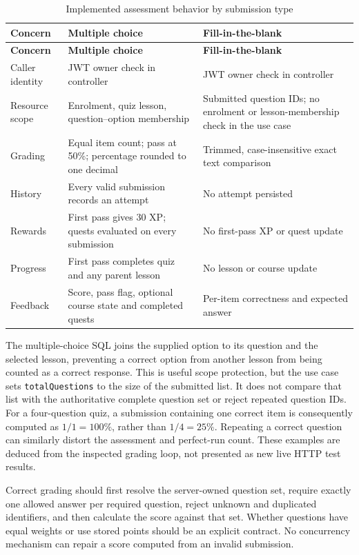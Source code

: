 \documentclass[12pt,a4paper,oneside]{report}
\begin{document}
\begin{longtable}{P{0.25\textwidth}P{0.32\textwidth}P{0.32\textwidth}}
\caption{Implemented assessment behavior by submission type}\label{tab:quiz-behavior}\\\toprule
\textbf{Concern} & \textbf{Multiple choice} & \textbf{Fill-in-the-blank}\\\midrule\endfirsthead
\toprule\textbf{Concern} & \textbf{Multiple choice} & \textbf{Fill-in-the-blank}\\\midrule\endhead
Caller identity & JWT owner check in controller & JWT owner check in controller\\
Resource scope & Enrolment, quiz lesson, question--option membership & Submitted question IDs; no enrolment or lesson-membership check in the use case\\
Grading & Equal item count; pass at 50\%; percentage rounded to one decimal & Trimmed, case-insensitive exact text comparison\\
History & Every valid submission records an attempt & No attempt persisted\\
Rewards & First pass gives 30 XP; quests evaluated on every submission & No first-pass XP or quest update\\
Progress & First pass completes quiz and any parent lesson & No lesson or course update\\
Feedback & Score, pass flag, optional course state and completed quests & Per-item correctness and expected answer\\
\bottomrule
\end{longtable}

The multiple-choice SQL joins the supplied option to its question and the selected
lesson, preventing a correct option from another lesson from being counted as a
correct response. This is useful scope protection, but the use case sets
\texttt{totalQuestions} to the size of the submitted list. It does not compare that
list with the authoritative complete question set or reject repeated question IDs.
For a four-question quiz, a submission containing one correct item is consequently
computed as $1/1 = 100\%$, rather than $1/4 = 25\%$. Repeating a correct question
can similarly distort the assessment and perfect-run count. These examples are
deduced from the inspected grading loop, not presented as new live HTTP test results.

Correct grading should first resolve the server-owned question set, require exactly
one allowed answer per required question, reject unknown and duplicated identifiers,
and then calculate the score against that set. Whether questions have equal weights
or use stored points should be an explicit contract. No concurrency mechanism can
repair a score computed from an invalid submission.
\end{document}
